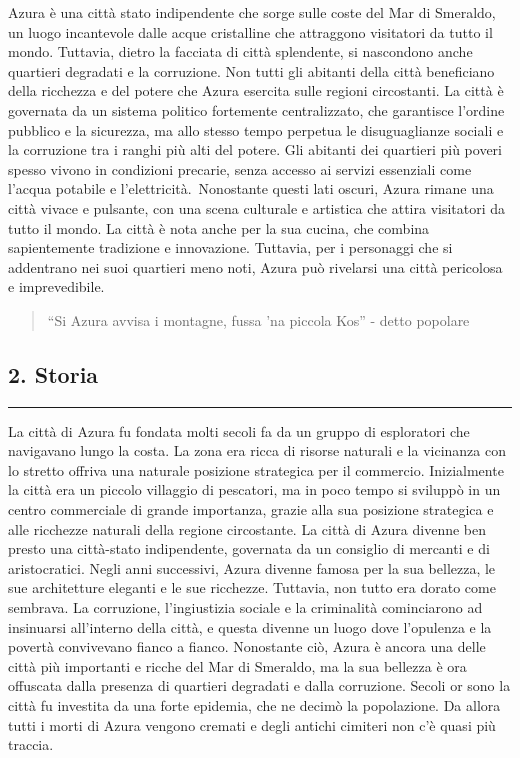 Azura è una città stato indipendente che sorge sulle coste del Mar di
Smeraldo, un luogo incantevole dalle acque cristalline che attraggono
visitatori da tutto il mondo. Tuttavia, dietro la facciata di città
splendente, si nascondono anche quartieri degradati e la corruzione. Non
tutti gli abitanti della città beneficiano della ricchezza e del potere
che Azura esercita sulle regioni circostanti. La città è governata da un
sistema politico fortemente centralizzato, che garantisce l'ordine
pubblico e la sicurezza, ma allo stesso tempo perpetua le disuguaglianze
sociali e la corruzione tra i ranghi più alti del potere. Gli abitanti
dei quartieri più poveri spesso vivono in condizioni precarie, senza
accesso ai servizi essenziali come l'acqua potabile e
l'elettricità.~Nonostante questi lati oscuri, Azura rimane una città
vivace e pulsante, con una scena culturale e artistica che attira
visitatori da tutto il mondo. La città è nota anche per la sua cucina,
che combina sapientemente tradizione e innovazione. Tuttavia, per i
personaggi che si addentrano nei suoi quartieri meno noti, Azura può
rivelarsi una città pericolosa e imprevedibile.

\begin{quote}
``Si Azura avvisa i montagne, fussa 'na piccola Kos'' - detto popolare
\end{quote}

\subsection{2. Storia}\label{storia}

\begin{center}\rule{0.5\linewidth}{0.5pt}\end{center}

La città di Azura fu fondata molti secoli fa da un gruppo di esploratori
che navigavano lungo la costa. La zona era ricca di risorse naturali e
la vicinanza con lo stretto offriva una naturale posizione strategica
per il commercio. Inizialmente la città era un piccolo villaggio di
pescatori, ma in poco tempo si sviluppò in un centro commerciale di
grande importanza, grazie alla sua posizione strategica e alle ricchezze
naturali della regione circostante. La città di Azura divenne ben presto
una città-stato indipendente, governata da un consiglio di mercanti e di
aristocratici. Negli anni successivi, Azura divenne famosa per la sua
bellezza, le sue architetture eleganti e le sue ricchezze. Tuttavia, non
tutto era dorato come sembrava. La corruzione, l'ingiustizia sociale e
la criminalità cominciarono ad insinuarsi all'interno della città, e
questa divenne un luogo dove l'opulenza e la povertà convivevano fianco
a fianco. Nonostante ciò, Azura è ancora una delle città più importanti
e ricche del Mar di Smeraldo, ma la sua bellezza è ora offuscata dalla
presenza di quartieri degradati e dalla corruzione. Secoli or sono la
città fu investita da una forte epidemia, che ne decimò la popolazione.
Da allora tutti i morti di Azura vengono cremati e degli antichi
cimiteri non c'è quasi più traccia.

